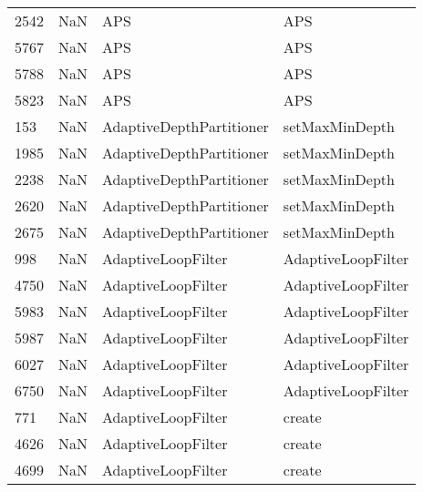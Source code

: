 \begin{tabular}{llll}
2542 &                   NaN &                        APS &                                       APS \\
5767 &                   NaN &                        APS &                                       APS \\
5788 &                   NaN &                        APS &                                       APS \\
5823 &                   NaN &                        APS &                                       APS \\
153  &                   NaN &   AdaptiveDepthPartitioner &                            setMaxMinDepth \\
1985 &                   NaN &   AdaptiveDepthPartitioner &                            setMaxMinDepth \\
2238 &                   NaN &   AdaptiveDepthPartitioner &                            setMaxMinDepth \\
2620 &                   NaN &   AdaptiveDepthPartitioner &                            setMaxMinDepth \\
2675 &                   NaN &   AdaptiveDepthPartitioner &                            setMaxMinDepth \\
998  &                   NaN &         AdaptiveLoopFilter &                        AdaptiveLoopFilter \\
4750 &                   NaN &         AdaptiveLoopFilter &                        AdaptiveLoopFilter \\
5983 &                   NaN &         AdaptiveLoopFilter &                        AdaptiveLoopFilter \\
5987 &                   NaN &         AdaptiveLoopFilter &                        AdaptiveLoopFilter \\
6027 &                   NaN &         AdaptiveLoopFilter &                        AdaptiveLoopFilter \\
6750 &                   NaN &         AdaptiveLoopFilter &                        AdaptiveLoopFilter \\
771  &                   NaN &         AdaptiveLoopFilter &                                    create \\
4626 &                   NaN &         AdaptiveLoopFilter &                                    create \\
4699 &                   NaN &         AdaptiveLoopFilter &                                    create \\

\end{tabular}
